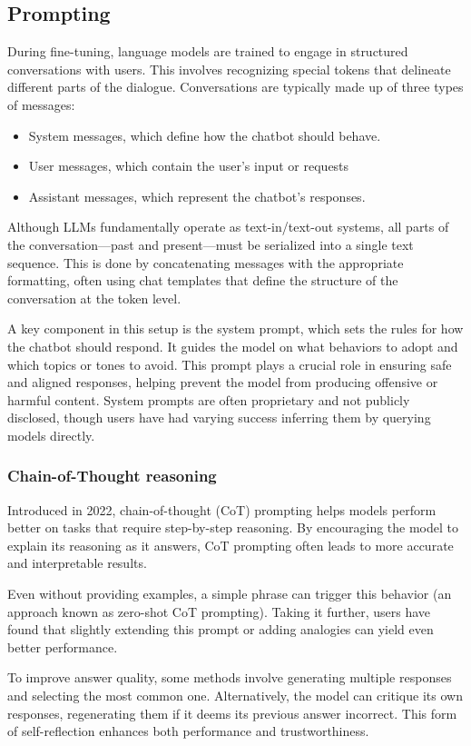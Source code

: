 \subsection{Prompting}
During fine-tuning, language models are trained to engage in structured conversations with users. 
This involves recognizing special tokens that delineate different parts of the dialogue. 
Conversations are typically made up of three types of messages: 
\begin{itemize}
    \item System messages, which define how the chatbot should behave. 
    \item User messages, which contain the user's input or requests
    \item Assistant messages, which represent the chatbot's responses.
\end{itemize}
\noindent Although LLMs fundamentally operate as text-in/text-out systems, all parts of the conversation—past and present—must be serialized into a single text sequence. 
This is done by concatenating messages with the appropriate formatting, often using chat templates that define the structure of the conversation at the token level.

A key component in this setup is the system prompt, which sets the rules for how the chatbot should respond. 
It guides the model on what behaviors to adopt and which topics or tones to avoid. This prompt plays a crucial role in ensuring safe and aligned responses, helping prevent the model from producing offensive or harmful content. 
System prompts are often proprietary and not publicly disclosed, though users have had varying success inferring them by querying models directly.

\subsubsection{Chain-of-Thought reasoning}
Introduced in 2022, chain-of-thought (CoT) prompting helps models perform better on tasks that require step-by-step reasoning. 
By encouraging the model to explain its reasoning as it answers, CoT prompting often leads to more accurate and interpretable results.

Even without providing examples, a simple phrase can trigger this behavior (an approach known as zero-shot CoT prompting). 
Taking it further, users have found that slightly extending this prompt or adding analogies can yield even better performance.

To improve answer quality, some methods involve generating multiple responses and selecting the most common one. 
Alternatively, the model can critique its own responses, regenerating them if it deems its previous answer incorrect. 
This form of self-reflection enhances both performance and trustworthiness.

